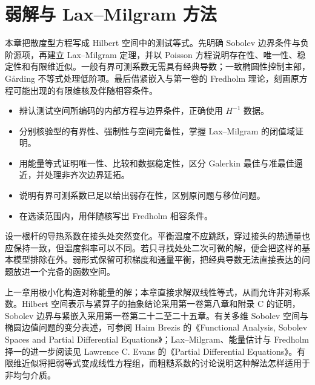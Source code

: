 \chapter{弱解与 Lax–Milgram 方法}
\label{b2:ch:15}
\begin{chapterabstract}
本章把散度型方程写成 Hilbert 空间中的测试等式。先明确 Sobolev 边界条件与负阶源项，再建立 Lax--Milgram 定理，并以 Poisson 方程说明存在性、唯一性、稳定性和有限维近似。一般有界可测系数无需具有经典导数；一致椭圆性控制主部，Gårding 不等式处理低阶项。最后借紧嵌入与第一卷的 Fredholm 理论，刻画原方程可能出现的有限维核及伴随相容条件。
\end{chapterabstract}

\begin{learninggoals}
\begin{itemize}
\item\label{b2:item:15-goal-weak}辨认测试空间所编码的内部方程与边界条件，正确使用 \(H^{-1}\) 数据。
\item\label{b2:item:15-goal-lax}分别核验型的有界性、强制性与空间完备性，掌握 Lax--Milgram 的闭值域证明。
\item\label{b2:item:15-goal-stability}用能量等式证明唯一性、比较和数据稳定性，区分 Galerkin 最佳与准最佳逼近，并处理非齐次边界延拓。
\item\label{b2:item:15-goal-general}说明有界可测系数已足以给出弱存在性，区别原问题与移位问题。
\item\label{b2:item:15-goal-fredholm}在选读范围内，用伴随核写出 Fredholm 相容条件。
\end{itemize}
\end{learninggoals}

设一根杆的导热系数在接头处突然变化。平衡温度不应跳跃，穿过接头的热通量也应保持一致，但温度斜率可以不同。若只寻找处处二次可微的解，便会把这样的基本模型排除在外。弱形式保留可积梯度和通量平衡，把经典导数无法直接表达的问题放进一个完备的函数空间。

\ProseParagraphBreak

上一章用极小化构造对称能量的解；本章直接求解双线性等式，从而允许非对称系数。Hilbert 空间表示与紧算子的抽象结论采用第一卷第八章和附录 C 的证明，Sobolev 边界与紧嵌入采用第一卷第二十二至二十五章。有关多维 Sobolev 空间与椭圆边值问题的变分表述，可参阅 Haim Brezis 的《Functional Analysis, Sobolev Spaces and Partial Differential Equations》\cite[Chapter 9]{Brezis2011Functional}；Lax--Milgram、能量估计与 Fredholm 择一的进一步阅读见 Lawrence C. Evans 的《Partial Differential Equations》\cite[Section 6.2]{Evans2010Partial}。有限维近似将把弱等式变成线性方程组，而粗糙系数的讨论说明这种解法怎样适用于非均匀介质。

